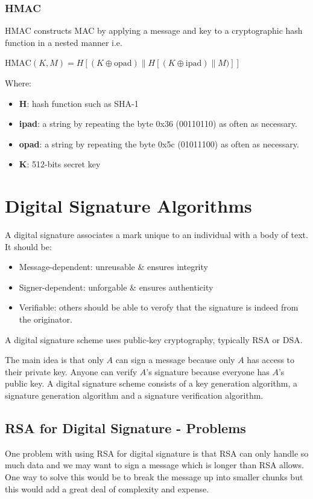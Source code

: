 \documentclass{article}
\begin{document}
\subsubsection{HMAC}
HMAC constructs MAC by applying a message and key to a cryptographic hash function in a nested manner i.e.
\begin{center}
  $\text{HMAC}(K, M) = H[(K \oplus \text{opad}) \| H[(K \oplus \text{ipad}) \| M)]]$
\end{center}
Where:
\begin{itemize}
  \item \textbf{H}: hash function such as SHA-1
  \item \textbf{ipad}: a string by repeating the byte 0x36 (00110110) as often as necessary.
  \item \textbf{opad}: a string by repeating the byte 0x5c (01011100) as often as necessary.
  \item \textbf{K}: 512-bits secret key
\end{itemize}

\section{Digital Signature Algorithms}
A digital signature associates a mark unique to an individual with a body of text. It should be:
\begin{itemize}
  \item Message-dependent: unreusable \& ensures integrity
  \item Signer-dependent: unforgable \& ensures authenticity
  \item Verifiable: others should be able to verofy that the signature is indeed from the originator.
\end{itemize}
A digital signature scheme uses public-key cryptography, typically RSA or DSA.

The main idea is that only $A$ can sign a message because only $A$ has access to their private key. Anyone can verify $A$'s signature because everyone has $A$'s public key. A digital signature scheme consists of a key generation algorithm, a signature generation algorithm and a signature verification algorithm.

\subsection{RSA for Digital Signature - Problems}
One problem with using RSA for digital signature is that RSA can only handle so much data and we may want to sign a message which is longer than RSA allows. One way to solve this would be to break the message up into smaller chunks but this would add a great deal of complexity and expense.
\end{document}
